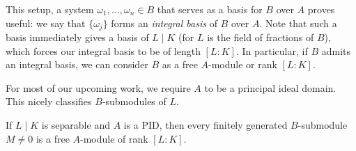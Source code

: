 This setup, a system $\omega_1,\dots,\omega_n\in B$ that serves as a basis for $B$ over $A$ proves useful: we say that $\{\omega_j\}$ forms an \emph{integral basis} of $B$ over $A$. Note that such a basis immediately gives a basis of $L\mid K$ (for $L$ is the field of fractions of $B$), which forces our integral basis to be of length $[L:K]$. In particular, if $B$ admits an integral basis, we can consider $B$ as a free $A$-module or rank $[L:K]$.

For most of our upcoming work, we require $A$ to be a principal ideal domain. This nicely classifies $B$-submodules of $L$.

\begin{proposition}
	If $L\mid K$ is separable and $A$ is a PID, then every finitely generated $B$-submodule $M\neq 0$ is a free $A$-module of rank $[L:K]$.
\end{proposition}
